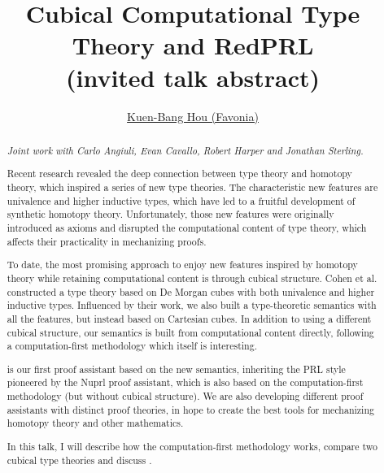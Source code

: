 \documentclass[submission,copyright,creativecommons]{eptcs}
\title{Cubical Computational Type Theory and RedPRL\\
  {\large (invited talk abstract)}
}
\author{\href{http://www.favonia.org/}{Kuen-Bang Hou (Favonia)}
  \institute{Institute for Advanced Study, Princeton}
  \email{favonia@gmail.com}
}
\begin{document}
\maketitle

\begin{abstract}
  \begin{center}
  \emph{Joint work with Carlo Angiuli, Evan Cavallo, Robert Harper and
  Jonathan Sterling.}
  \end{center}
  \medskip

  Recent research revealed the deep connection between type theory and
  homotopy theory, which inspired a series of new type theories. The
  characteristic new features are univalence and higher inductive
  types, which have led to a fruitful development of synthetic
  homotopy theory. Unfortunately, those new features were originally
  introduced as axioms and disrupted the computational content of type
  theory, which affects their practicality in mechanizing proofs.

  To date, the most promising approach to enjoy new features inspired
  by homotopy theory while retaining computational content is through
  cubical structure. Cohen et al. constructed a type theory based on
  De Morgan cubes with both univalence and higher inductive
  types. Influenced by their work, we also built a type-theoretic
  semantics with all the features, but instead based on Cartesian
  cubes. In addition to using a different cubical structure, our
  semantics is built from computational content directly, following a
  computation-first methodology which itself is interesting.

  \href{http://www.redprl.org/}{\RedPRL{}} is our first proof assistant
  based on the new semantics, inheriting the PRL style pioneered by
  the Nuprl proof assistant, which is also based on the
  computation-first methodology (but without cubical structure). We
  are also developing different proof assistants with distinct proof
  theories, in hope to create the best tools for mechanizing homotopy
  theory and other mathematics.

  In this talk, I will describe how the computation-first methodology
  works, compare two cubical type theories and discuss \RedPRL{}.
\end{abstract}
\end{document}
